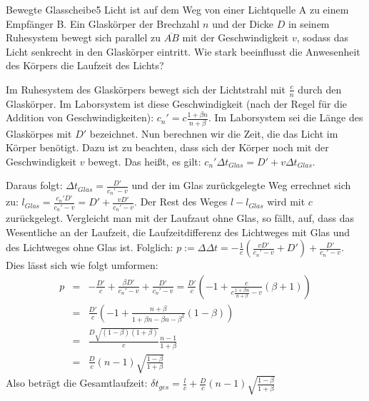 \begin{problem}{Bewegte Glasscheibe}{5}
Licht ist auf dem Weg von einer Lichtquelle A zu einem Empfänger B. Ein Glaskörper der Brechzahl $n$ und der Dicke $D$ in seinem Ruhesystem bewegt sich parallel zu $\overline{AB}$ mit der Geschwindigkeit $v$, sodass das Licht senkrecht in den Glaskörper eintritt. Wie stark beeinflusst die Anwesenheit des Körpers die Laufzeit des Lichts?
\begin{solution}
Im Ruhesystem des Glaskörpers bewegt sich der Lichtstrahl mit $\frac cn$ durch den Glaskörper. Im Laborsystem ist diese Geschwindigkeit (nach der Regel für die Addition von Geschwindigkeiten): $c_n'=c\frac{1+\beta n}{n+\beta}$. Im Laborsystem sei die Länge des Glaskörpes mit $D'$ bezeichnet. Nun berechnen wir die Zeit, die das Licht im Körper benötigt. Dazu ist zu beachten, dass sich der Körper noch mit der Geschwindigkeit $v$ bewegt. Das heißt, es gilt: $c_n'\Delta t_{Glas}=D'+v\Delta t_{Glas}$.

Daraus folgt: $\Delta t_{Glas}=\frac{D'}{c_n'-v}$ und der im Glas zurückgelegte Weg errechnet sich zu: $l_{Glas}=\frac{c_n'D'}{c_n'-v}=D'+\frac{vD'}{c_n'-v}$. Der Rest des Weges $l-l_{Glas}$ wird mit $c$ zurückgelegt. Vergleicht man mit der Laufzaut ohne Glas, so fällt, auf, dass das Wesentliche an der Laufzeit, die Laufzeitdifferenz des Lichtweges mit Glas und des Lichtweges ohne Glas ist. Folglich: $p:=\Delta \Delta t=-\frac 1c (\frac{vD'}{c_n'-v}+D')+\frac{D'}{c_n'-v}$. Dies lässt sich wie folgt umformen:
\begin{eqnarray}
\nonumber p&=&-\frac{D'}c+\frac{\beta D'}{c_n'-v}+\frac{D'}{c_n'-v}=\frac{D'}{c}\left(-1+\frac{c}{c\frac{1+\beta n}{n+\beta}-v}(\beta+1)\right)\\
\nonumber &=&\frac{D'}c\left(-1+\frac{n+\beta}{1+\beta n-\beta n-\beta^2}(1-\beta)\right)\\
\nonumber &=&\frac{D\sqrt{(1-\beta)(1+\beta)}}{c}\frac{n-1}{1+\beta}\\
\nonumber &=&\frac Dc(n-1)\sqrt{\frac{1-\beta}{1+\beta}}
\end{eqnarray}
Also beträgt die Gesamtlaufzeit: $\delta t_{ges}=\frac lc+\frac Dc(n-1)\sqrt{\frac{1-\beta}{1+\beta}}$
\end{solution}
\end{problem}

